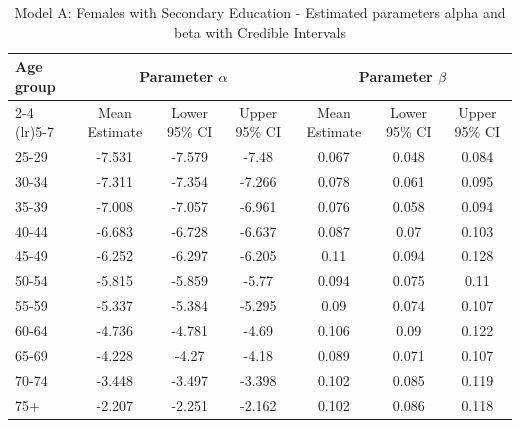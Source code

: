 \begin{landscape}
\begin{table}[htbp]
\centering
\caption{Model A: Females with Secondary Education - Estimated parameters alpha and beta  with Credible Intervals}
\label{tab:parameters_ab3}
\begin{tabular}{@{}lcccccc@{}}
\toprule
Age group & \multicolumn{3}{c}{Parameter \(\alpha\)} & \multicolumn{3}{c}{Parameter \(\beta\)} \\ 
\cmidrule(lr){2-4} \cmidrule(lr){5-7}
          & Mean Estimate & Lower 95\% CI & Upper 95\% CI & Mean Estimate & Lower 95\% CI & Upper 95\% CI \\ 
\midrule
25-29 & -7.531 & -7.579 & -7.48 & 0.067 & 0.048 & 0.084 \\
30-34 & -7.311 & -7.354 & -7.266 & 0.078 & 0.061 & 0.095 \\
35-39 & -7.008 & -7.057 & -6.961 & 0.076 & 0.058 & 0.094 \\
40-44 & -6.683 & -6.728 & -6.637 & 0.087 & 0.07 & 0.103 \\
45-49 & -6.252 & -6.297 & -6.205 & 0.11 & 0.094 & 0.128 \\
50-54 & -5.815 & -5.859 & -5.77 & 0.094 & 0.075 & 0.11 \\
55-59 & -5.337 & -5.384 & -5.295 & 0.09 & 0.074 & 0.107 \\
60-64 & -4.736 & -4.781 & -4.69 & 0.106 & 0.09 & 0.122 \\
65-69 & -4.228 & -4.27 & -4.18 & 0.089 & 0.071 & 0.107 \\
70-74 & -3.448 & -3.497 & -3.398 & 0.102 & 0.085 & 0.119 \\
75+ & -2.207 & -2.251 & -2.162 & 0.102 & 0.086 & 0.118 \\
\bottomrule
\end{tabular}
\end{table}
\end{landscape}
